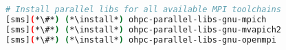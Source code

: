 
\begin{lstlisting}[language=bash,keywords={},upquote=true,keepspaces]
# Install parallel libs for all available MPI toolchains
[sms](*\#*) (*\install*) ohpc-parallel-libs-gnu-mpich
[sms](*\#*) (*\install*) ohpc-parallel-libs-gnu-mvapich2
[sms](*\#*) (*\install*) ohpc-parallel-libs-gnu-openmpi
\end{lstlisting}
